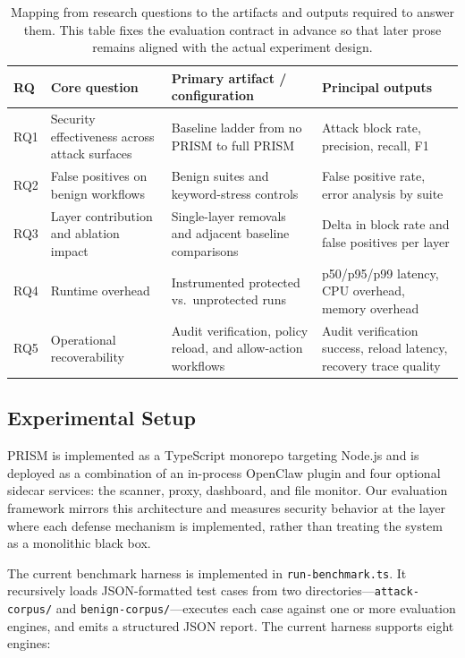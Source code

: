 \begin{table}[t]
\centering
\footnotesize
\begin{tabularx}{\textwidth}{l X X X}
\toprule
RQ & Core question & Primary artifact / configuration & Principal outputs \\
\midrule
RQ1 & Security effectiveness across attack surfaces & Baseline ladder from no PRISM to full PRISM & Attack block rate, precision, recall, F1 \\
RQ2 & False positives on benign workflows & Benign suites and keyword-stress controls & False positive rate, error analysis by suite \\
RQ3 & Layer contribution and ablation impact & Single-layer removals and adjacent baseline comparisons & Delta in block rate and false positives per layer \\
RQ4 & Runtime overhead & Instrumented protected vs.\ unprotected runs & p50/p95/p99 latency, CPU overhead, memory overhead \\
RQ5 & Operational recoverability & Audit verification, policy reload, and allow-action workflows & Audit verification success, reload latency, recovery trace quality \\
\bottomrule
\end{tabularx}
\caption{Mapping from research questions to the artifacts and outputs required to answer them. This table fixes the evaluation contract in advance so that later prose remains aligned with the actual experiment design.}
\label{tab:rq-mapping}
\end{table}

\subsection{Experimental Setup}

PRISM is implemented as a TypeScript monorepo targeting Node.js and is deployed as a combination of an in-process OpenClaw plugin and four optional sidecar services: the scanner, proxy, dashboard, and file monitor. Our evaluation framework mirrors this architecture and measures security behavior at the layer where each defense mechanism is implemented, rather than treating the system as a monolithic black box.

The current benchmark harness is implemented in \texttt{run-benchmark.ts}. It recursively loads JSON-formatted test cases from two directories---\texttt{attack-corpus/} and \texttt{benign-corpus/}---executes each case against one or more evaluation engines, and emits a structured JSON report. The current harness supports eight engines:

